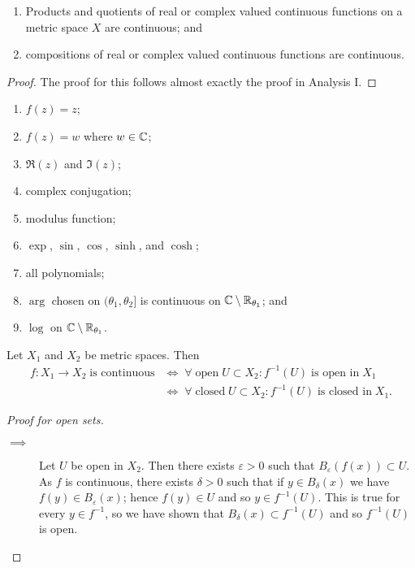 \begin{lemma}
   \begin{enumerate}
       \item Products and quotients of real or complex valued continuous functions on a metric space $X$ are continuous; and
       \item compositions of real or complex valued continuous functions are continuous.
   \end{enumerate} 
\end{lemma}

\begin{proof}
    The proof for this follows almost exactly the proof in Analysis I.
\end{proof}

\begin{example}
    \begin{enumerate}
        \item $f(z) = z$;
        \item $f(z) = w$ where $w \in \mathbb{C}$;
        \item $\Re(z)$ and $\Im(z)$;
        \item complex conjugation;
        \item modulus function;
        \item $\exp$, $\sin$, $\cos$, $\sinh$, and $\cosh$;
        \item all polynomials;
        \item $\arg$ chosen on $(\theta_1, \theta_2]$ is continuous on $\mathbb{C} \setminus \mathbb{R}_{\theta_1}$; and
        \item $\log$ on $\mathbb{C} \setminus \mathbb{R}_{\theta_1}$.
    \end{enumerate}
\end{example}

\begin{theorem}
    Let $X_1$ and $X_2$ be metric spaces. Then
    \begin{align*}
        f: X_1 \to X_2 \;\text{is continuous} &\iff \;\forall\; \text{open}\; U \subset X_2: f^{-1}(U) \;\text{is open in}\; X_1 \\ 
                                              &\iff \;\forall\; \text{closed}\; U \subset X_2: f^{-1}(U) \;\text{is closed in}\; X_1.
    \end{align*}
\end{theorem}

\begin{proof}[Proof for open sets]
    \begin{description}
        \item[$\implies$] Let $U$ be open in $X_2$. Then there exists $\varepsilon > 0$ such that $B_\varepsilon(f(x)) \subset U$. As $f$ is continuous, there exists $\delta > 0$ such that if $y \in B_\delta(x)$ we have $f(y) \in B_\varepsilon(x)$; hence $f(y) \in U$ and so $y \in f^{-1}(U)$. This is true for every $y \in f^{-1}$, so we have shown that $B_\delta(x) \subset f^{-1}(U)$ and so $f^{-1}(U)$ is open.
    \end{description}
\end{proof}

